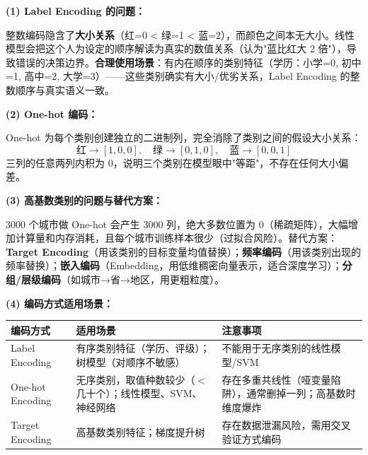 \documentclass[a4paper,11pt]{ctexart}
\begin{document}
\begin{solutionbox}[参考答案与详细解析]
    \textbf{(1) Label Encoding 的问题：}

    整数编码隐含了\textbf{大小关系}（红=0 < 绿=1 < 蓝=2），而颜色之间本无大小。线性模型会把这个人为设定的顺序解读为真实的数值关系（认为"蓝比红大 2 倍"），导致错误的决策边界。\textbf{合理使用场景}：有内在顺序的类别特征（学历：小学=0, 初中=1, 高中=2, 大学=3）——这些类别确实有大小/优劣关系，Label Encoding 的整数顺序与真实语义一致。

    \textbf{(2) One-hot 编码：}

    One-hot 为每个类别创建独立的二进制列，完全消除了类别之间的假设大小关系：
    \[
    \text{红} \to [1, 0, 0], \quad \text{绿} \to [0, 1, 0], \quad \text{蓝} \to [0, 0, 1]
    \]
    三列的任意两列内积为 0，说明三个类别在模型眼中"等距"，不存在任何大小偏差。

    \textbf{(3) 高基数类别的问题与替代方案：}

    3000 个城市做 One-hot 会产生 3000 列，绝大多数位置为 0（稀疏矩阵），大幅增加计算量和内存消耗，且每个城市训练样本很少（过拟合风险）。替代方案：\textbf{Target Encoding}（用该类别的目标变量均值替换）；\textbf{频率编码}（用该类别出现的频率替换）；\textbf{嵌入编码}（Embedding，用低维稠密向量表示，适合深度学习）；\textbf{分组/层级编码}（如城市→省→地区，用更粗粒度）。

    \textbf{(4) 编码方式适用场景：}
    \begin{center}
    \begin{tabular}{p{3cm} p{5cm} p{4.5cm}}
        \toprule
        编码方式 & 适用场景 & 注意事项 \\
        \midrule
        Label Encoding & 有序类别特征（学历、评级）；树模型（对顺序不敏感） & 不能用于无序类别的线性模型/SVM \\[0.8em]
        One-hot Encoding & 无序类别，取值种数较少（$<$ 几十个）；线性模型、SVM、神经网络 & 存在多重共线性（哑变量陷阱），通常删掉一列；高基数时维度爆炸 \\[0.8em]
        Target Encoding & 高基数类别特征；梯度提升树 & 存在数据泄漏风险，需用交叉验证方式编码 \\
        \bottomrule
    \end{tabular}
    \end{center}
\end{solutionbox}
\end{document}
